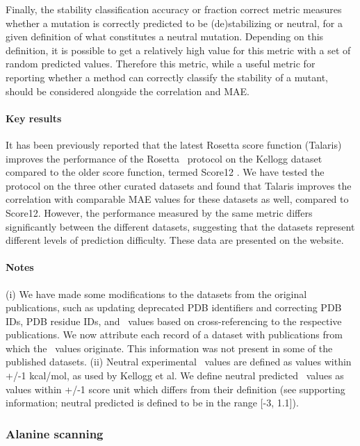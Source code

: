 Finally, the stability classification accuracy or fraction correct metric measures whether a mutation is correctly predicted to be (de)stabilizing or neutral, for a given definition of what constitutes a neutral mutation. Depending on this definition, it is possible to get a relatively high value for this metric with a set of random predicted values. Therefore this metric, while a useful metric for reporting whether a method can correctly classify the stability of a mutant, should be considered alongside the correlation and MAE.

\paragraph{Key results}

It has been previously reported that the latest Rosetta score function (Talaris) improves the performance of the Rosetta \ddg\ protocol on the Kellogg dataset compared to the older score function, termed Score12 \cite{omeara_combined_2015}. We have tested the protocol on the three other curated datasets and found that Talaris improves the correlation with comparable MAE values for these datasets as well, compared to Score12. However, the performance measured by the same metric differs significantly between the different datasets, suggesting that the datasets represent different levels of prediction difficulty. These data are presented on the website.

\paragraph{Notes}

(i) We have made some modifications to the datasets from the original publications, such as updating deprecated PDB identifiers and correcting PDB IDs, PDB residue IDs, and \ddg\ values based on cross-referencing to the respective publications. We now attribute each record of a dataset with publications from which the \ddg\ values originate. This information was not present in some of the published datasets. (ii) Neutral experimental \ddg\ values are defined as values within +/-1 kcal/mol, as used by Kellogg et al. We define neutral predicted \ddg\ values as values within +/-1 score unit which differs from their definition (see \cite{kellogg_role_2011} supporting information; neutral predicted is defined to be in the range [-3, 1.1]).

\subsubsection{Alanine scanning}


